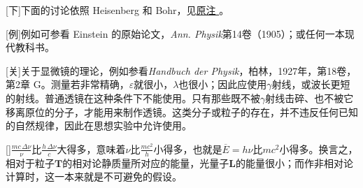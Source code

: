 \documentclass[fontsize=13pt,twoside,openany,headings=normal,parskip=false,bookmarkpackage=false,DIV=calc]{scrbook}
\begin{document}
[下]{下面的讨论依照 Heisenberg 和 Bohr，见\CJKglue \hyperlink{note-131}{原注 }。}

[例]{例如可参看 Einstein 的原始论文，\emph{Ann. Physik}第14卷（1905）；或任何一本现代教科书。}

[关]{关于显微镜的理论，例如参看\emph{Handbuch der Physik}，柏林，1927年，第18卷，第2章 G。测量若非常精确，$\varepsilon$就很小，$\lambda$也很小；因此应使用$\gamma$射线，或波长更短的射线。普通透镜在这种条件下不能使用。只有那些既不被$\gamma$射线击碎、也不被它移离原位的分子，才能用来制作透镜。这类分子或粒子的存在，并不违反任何已知的自然规律，因此在思想实验中允许使用。}

[]{\hypertarget{origpage-252}{}\label{origpage-252}$\frac{mc\,\Delta\nu}{\nu}$比$\frac{h\,\Delta\nu}{c}$大得多，意味着$\nu$比$\frac{mc^2}{h}$小得多，也就是$\overline E=h\nu$比$mc^2$小得多。换言之，相对于粒子$\boldsymbol T$的相对论静质量所对应的能量，光量子$\boldsymbol L$的能量很小；而作非相对论计算时，这一本来就是不可避免的假设。}
\end{document}
